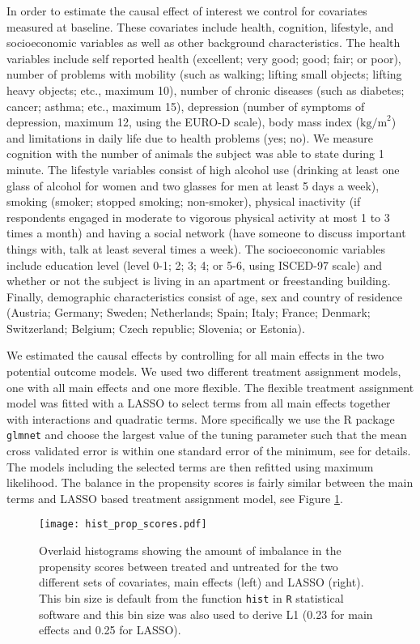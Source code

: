 \documentclass[11pt]{article}
\begin{document}
In order to estimate the causal effect of interest we control for covariates measured at baseline. These covariates include health, cognition, lifestyle, and socioeconomic variables as well as other background characteristics. The health variables include self reported health (excellent; very good; good; fair; or poor), number of problems with mobility (such as walking; lifting small objects; lifting heavy objects; etc., maximum 10), number of chronic diseases (such as diabetes; cancer; asthma; etc., maximum 15), depression (number of symptoms of depression, maximum 12, using the EURO-D scale), body mass index ($\mbox{kg/m}^2$) and limitations in daily life due to health problems (yes; no). We measure cognition with the number of animals the subject was able to state during 1 minute. The lifestyle variables consist of high alcohol use (drinking at least one glass of alcohol for women and two glasses for men at least 5 days a week), smoking (smoker; stopped smoking; non-smoker), physical inactivity (if respondents engaged in moderate to vigorous physical activity at most 1 to 3 times a month) and having a social network (have someone to discuss important things with, talk at least several times a week). The socioeconomic variables include education level (level 0-1; 2; 3; 4; or 5-6, using ISCED-97 scale) and whether or not the subject is living in an apartment or freestanding building. Finally, demographic characteristics consist of age, sex and country of residence (Austria; Germany; Sweden; Netherlands; Spain; Italy; France; Denmark; Switzerland; Belgium; Czech republic; Slovenia; or Estonia).

We estimated the causal effects by controlling for all main effects in the two potential outcome models. We used two different treatment assignment models, one with all main effects and one more flexible. The flexible treatment assignment model was fitted with a LASSO to select terms from all main effects together with interactions and quadratic terms. More specifically we use the R package {\tt glmnet} and  choose the largest value of the tuning parameter such that the mean cross validated error is within one standard error of the minimum, see \cite{glmnet} for details. The models including the selected terms are then refitted using maximum likelihood. The balance in the propensity scores is fairly similar between the main terms and LASSO based treatment assignment model, see Figure \ref{prop.sc.hist}.

\begin{figure}
\caption{Overlaid histograms showing the amount of imbalance in the propensity scores between treated and untreated for the two different sets of covariates, main effects (left) and LASSO (right). This bin size is default from the function {\tt hist} in {\tt R} statistical software and this bin size was also used to derive L1 (0.23 for main effects and 0.25 for LASSO).}
\begin{center}
\texttt{[image: hist\_prop\_scores.pdf]}
\end{center}
\label{prop.sc.hist}
\end{figure}
\end{document}
